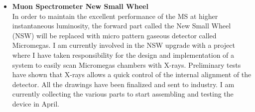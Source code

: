 \documentclass[12pt]{article}
\begin{document}
\begin{itemize}[leftmargin=1.3cm]

\item[] {\bf Muon Spectrometer New Small Wheel}\\
In order to maintain the excellent performance of the MS at higher instantaneous luminosity, the forward part called the New Small Wheel (NSW)
will be replaced with micro pattern gaseous detector called Micromegas.
I am currently involved in the NSW upgrade with a project where I have taken responsibility for the design and implementation of a system to easily scan Micromegas 
chambers with X-rays. 
Preliminary tests have shown that X-rays allows a quick control of the internal alignment of the detector.
All the drawings have been finalized and sent to industry. I am currently collecting the various parts to start assembling and testing the device in April.
\vspace{2.5mm}



\end{itemize}
\end{document}
